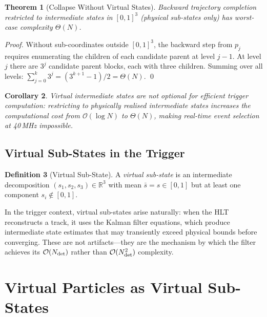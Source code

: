 \documentclass[twocolumn,10pt,a4paper]{article}
\theoremstyle{thmstyle}
\newtheorem{theorem}{Theorem}[section]
\newtheorem{corollary}[theorem]{Corollary}
\theoremstyle{definition}
\newtheorem{definition}[theorem]{Definition}
\theoremstyle{remark}
\newcommand{\R}{\mathbb{R}}
\begin{document}
\begin{theorem}[Collapse Without Virtual States]
\label{thm:collapse}
Backward trajectory completion restricted to intermediate states in
$[0,1]^3$ (physical sub-states only) has worst-case complexity
$\Theta(N)$.
\end{theorem}

\begin{proof}
Without sub-coordinates outside $[0,1]^3$, the backward step from
$p_j$ requires enumerating the children of each candidate parent at
level $j-1$. At level $j$ there are $3^j$ candidate parent blocks,
each with three children. Summing over all levels:
$\sum_{j=0}^{k} 3^j = (3^{k+1}-1)/2 = \Theta(N)$. \qed
\end{proof}

\begin{corollary}
Virtual intermediate states are not optional for efficient trigger
computation: restricting to physically realised intermediate states
increases the computational cost from $\mathcal{O}(\log N)$ to
$\Theta(N)$, making real-time event selection at 40\,MHz impossible.
\end{corollary}

\subsection{Virtual Sub-States in the Trigger}

\begin{definition}[Virtual Sub-State]
A \emph{virtual sub-state} is an intermediate decomposition
$(s_1, s_2, s_3) \in \R^3$ with mean $\bar{s} = s \in [0,1]$
but at least one component $s_i \notin [0,1]$.
\end{definition}

In the trigger context, virtual sub-states arise naturally: when the
HLT reconstructs a track, it uses the Kalman filter equations, which
produce intermediate state estimates that may transiently exceed
physical bounds before converging. These are not artifacts---they are
the mechanism by which the filter achieves its $\mathcal{O}(N_{\rm
det})$ rather than $\mathcal{O}(N_{\rm det}^2)$ complexity.

\section{Virtual Particles as Virtual Sub-States}
\label{sec:virtual}
\end{document}
